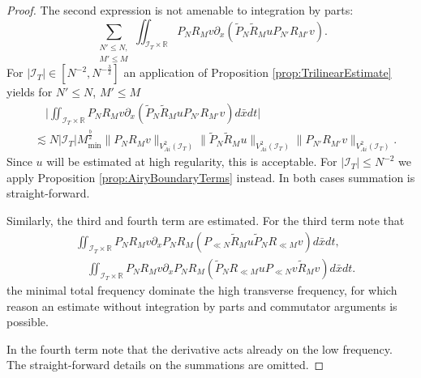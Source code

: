 \documentclass{amsart}
\theoremstyle{definition}
\newcommand{\R}{\mathbb{R}}
\begin{document}
\begin{proof}
The second expression is not amenable to integration by parts:
\begin{equation*}
\sum_{\substack{N' \leq N, \\ M' \leq M}} \iint_{\mathcal{I}_T \times \R} P_N R_M v \partial_x (\tilde{P}_N \tilde{R}_M u P_{N'} R_{M'} v). 
\end{equation*}
For $|\mathcal{I}_T| \in [N^{-2}, N^{-\frac{3}{2}}]$ an application of Proposition \ref{prop:TrilinearEstimate} yields for $N' \leq N$, $M' \leq M$
\begin{equation*}
\begin{split}
&\quad \big| \iint_{\mathcal{I}_T \times \R} P_N R_M v \partial_x (\tilde{P}_N \tilde{R}_M u P_{N'} R_{M'} v ) d \bar{x} dt \big| \\
&\lesssim N |\mathcal{I}_T| M_{\min}^{\frac{b}{2}} \| P_N R_M v \|_{V^2_{Ai}(\mathcal{I}_T)} \| \tilde{P}_N \tilde{R}_M u \|_{V^2_{Ai}(\mathcal{I}_T)} \| P_{N'} R_{M'} v \|_{V^2_{Ai}(\mathcal{I}_T)}.
\end{split}
\end{equation*}
Since $u$ will be estimated at high regularity, this is acceptable. For $|\mathcal{I}_T| \leq N^{-2}$ we apply Proposition \ref{prop:AiryBoundaryTerms} instead. In both cases summation is straight-forward.

Similarly, the third and fourth term are estimated. For the third term note that
\begin{equation*}
\begin{split}
 &\iint_{\mathcal{I}_T \times \R} P_N R_M v \partial_x P_N R_M (P_{\ll N} \tilde{R}_M u \tilde{P}_N R_{\ll M} v) d\bar{x} dt, \\
 &\quad \iint_{\mathcal{I}_T \times \R} P_N R_M v \partial_x P_N R_M (\tilde{P}_N R_{\ll M} u P_{\ll N} v \tilde{R}_M v) d\bar{x} dt.
 \end{split}
\end{equation*}
the minimal total frequency dominate the high transverse frequency, for which reason an estimate without integration by parts and commutator arguments is possible.

In the fourth term note that the derivative acts already on the low frequency. The straight-forward details on the summations are omitted.


\end{proof}
\end{document}
